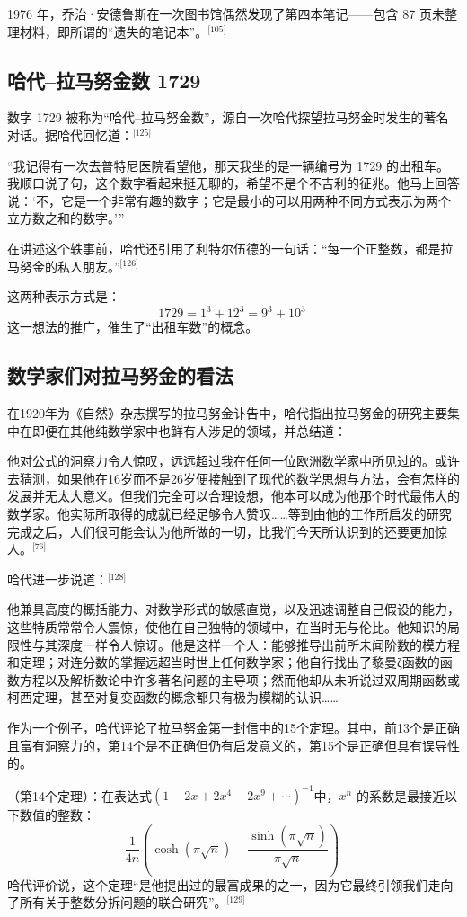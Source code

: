 1976 年，乔治·安德鲁斯在一次图书馆偶然发现了第四本笔记——包含 87 页未整理材料，即所谓的“遗失的笔记本”。\(^\text{[105]}\)
\subsection{哈代–拉马努金数 1729}
数字 1729 被称为“哈代–拉马努金数”，源自一次哈代探望拉马努金时发生的著名对话。据哈代回忆道：\(^\text{[125]}\)

“我记得有一次去普特尼医院看望他，那天我坐的是一辆编号为 1729 的出租车。我顺口说了句，这个数字看起来挺无聊的，希望不是个不吉利的征兆。他马上回答说：‘不，它是一个非常有趣的数字；它是最小的可以用两种不同方式表示为两个立方数之和的数字。’”

在讲述这个轶事前，哈代还引用了利特尔伍德的一句话：“每一个正整数，都是拉马努金的私人朋友。”\(^\text{[126]}\)

这两种表示方式是：
$$
1729 = 1^3 + 12^3 = 9^3 + 10^3~
$$
这一想法的推广，催生了“出租车数”的概念。
\subsection{数学家们对拉马努金的看法}
在1920年为《自然》杂志撰写的拉马努金讣告中，哈代指出拉马努金的研究主要集中在即便在其他纯数学家中也鲜有人涉足的领域，并总结道：

他对公式的洞察力令人惊叹，远远超过我在任何一位欧洲数学家中所见过的。或许去猜测，如果他在16岁而不是26岁便接触到了现代的数学思想与方法，会有怎样的发展并无太大意义。但我们完全可以合理设想，他本可以成为他那个时代最伟大的数学家。他实际所取得的成就已经足够令人赞叹……等到由他的工作所启发的研究完成之后，人们很可能会认为他所做的一切，比我们今天所认识到的还要更加惊人。\(^\text{[76]}\)

哈代进一步说道：\(^\text{[128]}\)

他兼具高度的概括能力、对数学形式的敏感直觉，以及迅速调整自己假设的能力，这些特质常常令人震惊，使他在自己独特的领域中，在当时无与伦比。他知识的局限性与其深度一样令人惊讶。他是这样一个人：能够推导出前所未闻阶数的模方程和定理；对连分数的掌握远超当时世上任何数学家；他自行找出了黎曼ζ函数的函数方程以及解析数论中许多著名问题的主导项；然而他却从未听说过双周期函数或柯西定理，甚至对复变函数的概念都只有极为模糊的认识……

作为一个例子，哈代评论了拉马努金第一封信中的15个定理。其中，前13个是正确且富有洞察力的，第14个是不正确但仍有启发意义的，第15个是正确但具有误导性的。

（第14个定理）：在表达式$\left(1 - 2x + 2x^4 - 2x^9 + \cdots \right)^{-1}$中，$x^n$ 的系数是最接近以下数值的整数：
$$
\frac{1}{4n} \left( \cosh(\pi \sqrt{n}) - \frac{\sinh(\pi \sqrt{n})}{\pi \sqrt{n}} \right)~
$$
哈代评价说，这个定理“是他提出过的最富成果的之一，因为它最终引领我们走向了所有关于整数分拆问题的联合研究”。\(^\text{[129]}\)


